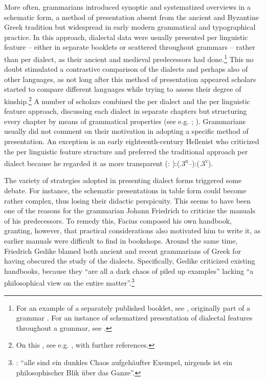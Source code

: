 More often, grammarians introduced synoptic and systematized overviews in a schematic form, a method of presentation absent from the ancient and Byzantine Greek tradition but widespread in early modern grammatical and typographical practice. In this approach, dialectal data were usually presented per linguistic feature – either in separate booklets or scattered throughout grammars – rather than per dialect, as their ancient and medieval predecessors had done.\footnote{For an example of a separately published booklet, see \citet{Amerot1530}, originally part of a grammar \citep{Amerot1520}. For an instance of schematized presentation of dialectal features throughout a grammar, see \citet{Gretser1593}.} This no doubt stimulated a contrastive comparison of the dialects and perhaps also of other languages, as not long after this method of presentation appeared scholars started to compare different languages while trying to assess their degree of kinship.\footnote{On this , see e.g. \citet{Considine2010b}, with further references.} A number of scholars combined the per dialect and the per linguistic feature approach, discussing each dialect in separate chapters but structuring every chapter by means of grammatical properties (see e.g. \citealt{Zwinger1605}; \citealt{Merigon1621}). Grammarians usually did not comment on their motivation in adopting a specific method of presentation. An exception is an early eighteenth-century Hellenist who criticized the per linguistic feature structure and preferred the traditional approach per dialect because he regarded it as more transparent (\citealt{Heupel1712}: {\footnotesize{):(}}.3\textsc{\textsuperscript{r}–}{\footnotesize{):(}}.3\textsc{\textsuperscript{v}}).

The variety of strategies adopted in presenting dialect forms triggered some debate. For instance, the schematic presentations in table form could become rather complex, thus losing their didactic perspicuity. This seems to have been one of the reasons for the grammarian Johann Friedrich \citet[\textsc{viii}]{Facius1782} to criticize the manuals of his predecessors. To remedy this, Facius composed his own handbook, granting, however, that practical considerations also motivated him to write it, as earlier manuals were difficult to find in bookshops. Around the same time, Friedrich Gedike blamed both ancient and recent grammarians of Greek for having obscured the study of the dialects. Specifically, Gedike criticized existing handbooks, because they “are all a dark chaos of piled up examples” lacking “a philosophical view on the entire matter”.\footnote{\citet[4]{Gedike1782}: “alle sind ein dunkles Chaos aufgehäufter Exempel, nirgends ist ein philosophischer Blik über das Ganze”.}


